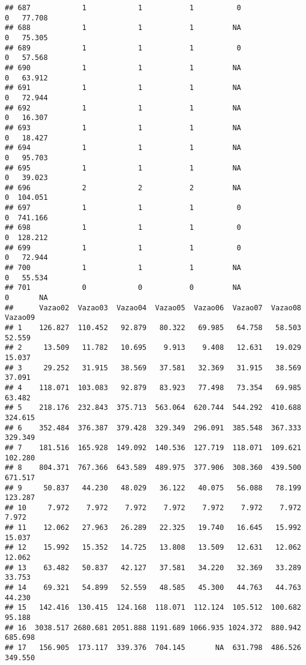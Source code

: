 \documentclass[
]{article}
\begin{document}
\begin{verbatim}
## 687            1            1           1          0                0   77.708
## 688            1            1           1         NA                0   75.305
## 689            1            1           1          0                0   57.568
## 690            1            1           1         NA                0   63.912
## 691            1            1           1         NA                0   72.944
## 692            1            1           1         NA                0   16.307
## 693            1            1           1         NA                0   18.427
## 694            1            1           1         NA                0   95.703
## 695            1            1           1         NA                0   39.023
## 696            2            2           2         NA                0  104.051
## 697            1            1           1          0                0  741.166
## 698            1            1           1          0                0  128.212
## 699            1            1           1          0                0   72.944
## 700            1            1           1         NA                0   55.534
## 701            0            0           0         NA                0       NA
##      Vazao02  Vazao03  Vazao04  Vazao05  Vazao06  Vazao07  Vazao08  Vazao09
## 1    126.827  110.452   92.879   80.322   69.985   64.758   58.503   52.559
## 2     13.509   11.782   10.695    9.913    9.408   12.631   19.029   15.037
## 3     29.252   31.915   38.569   37.581   32.369   31.915   38.569   37.091
## 4    118.071  103.083   92.879   83.923   77.498   73.354   69.985   63.482
## 5    218.176  232.843  375.713  563.064  620.744  544.292  410.688  324.615
## 6    352.484  376.387  379.428  329.349  296.091  385.548  367.333  329.349
## 7    181.516  165.928  149.092  140.536  127.719  118.071  109.621  102.280
## 8    804.371  767.366  643.589  489.975  377.906  308.360  439.500  671.517
## 9     50.837   44.230   48.029   36.122   40.075   56.088   78.199  123.287
## 10     7.972    7.972    7.972    7.972    7.972    7.972    7.972    7.972
## 11    12.062   27.963   26.289   22.325   19.740   16.645   15.992   15.037
## 12    15.992   15.352   14.725   13.808   13.509   12.631   12.062   12.062
## 13    63.482   50.837   42.127   37.581   34.220   32.369   33.289   33.753
## 14    69.321   54.899   52.559   48.585   45.300   44.763   44.763   44.230
## 15   142.416  130.415  124.168  118.071  112.124  105.512  100.682   95.188
## 16  3038.517 2680.681 2051.888 1191.689 1066.935 1024.372  880.942  685.698
## 17   156.905  173.117  339.376  704.145       NA  631.798  486.526  349.550

\end{verbatim}
\end{document}
